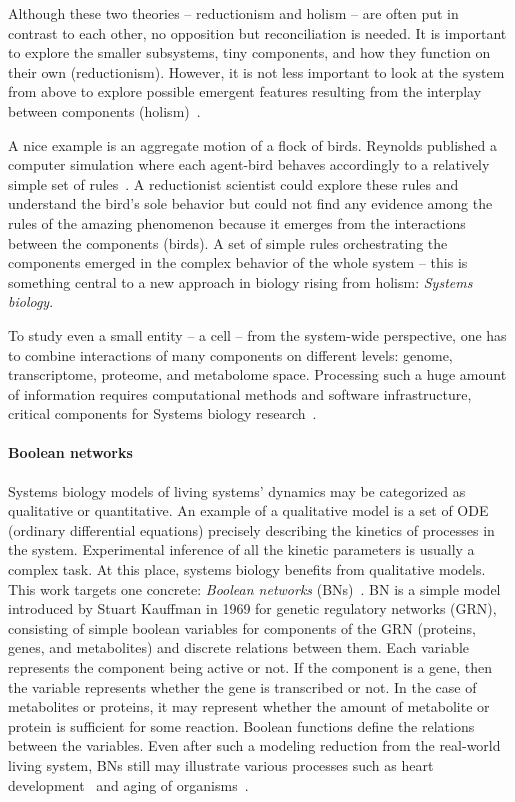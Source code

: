 \documentclass[
	digital, oneside, nosansbold, nocolorbold, nolot, nolof
]{fithesis4}
\theoremstyle{definition}
\theoremstyle{definition}
\begin{document}
Although these two theories -- reductionism and holism -- are often put in
contrast to each other, no opposition but reconciliation is needed. It is
important to explore the smaller subsystems, tiny components, and how they
function on their own (reductionism). However, it is not less important to look
at the system from above to explore possible emergent features resulting from
the interplay between components (holism)~\cite{systems_bio_hist}.

A nice example is an aggregate motion of a flock of birds. Reynolds published
a computer simulation where each agent-bird behaves accordingly to a relatively
simple set of rules~\cite{reynolds_flock}. A reductionist scientist could
explore these rules and understand the bird's sole behavior but could not find
any evidence among the rules of the amazing phenomenon because it emerges from
the interactions between the components (birds). A set of simple rules
orchestrating the components emerged in the complex behavior of the whole
system -- this is something central to a new approach in biology rising from
holism: \emph{Systems biology}.

To study even a small entity -- a cell -- from the system-wide perspective, one
has to combine interactions of many components on different levels: genome,
transcriptome, proteome, and metabolome space. Processing such a huge amount of
information requires computational methods and software infrastructure,
critical components for Systems biology research~\cite{kitano_overview,
systems_bio_methods}.

\paragraph{Boolean networks}

Systems biology models of living systems' dynamics may be categorized as
qualitative or quantitative. An example of a qualitative model is a set of ODE
(ordinary differential equations) precisely describing the kinetics of
processes in the system. Experimental inference of all the kinetic parameters
is usually a complex task. At this place, systems biology benefits from
qualitative models. This work targets one concrete: \emph{Boolean networks}
(BNs)~\cite{concepts_bn}. BN is a simple model introduced by Stuart Kauffman in
1969 for genetic regulatory networks (GRN), consisting of simple boolean
variables for components of the GRN (proteins, genes, and metabolites) and
discrete relations between them.  Each variable represents the component being
active or not. If the component is a gene, then the variable represents whether
the gene is transcribed or not. In the case of metabolites or proteins, it may
represent whether the amount of metabolite or protein is sufficient for some
reaction.  Boolean functions define the relations between the variables. Even
after such a modeling reduction from the real-world living system, BNs still
may illustrate various processes such as heart
development~\cite{heart_development} and aging of organisms~\cite{aging}.
\end{document}
